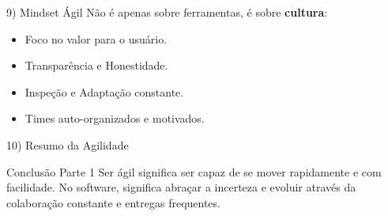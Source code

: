 \documentclass[aspectratio=169]{beamer}
\begin{document}
\begin{frame}{9) Mindset Ágil}
  Não é apenas sobre ferramentas, é sobre \textbf{cultura}:
  \begin{itemize}
    \item Foco no valor para o usuário.
    \item Transparência e Honestidade.
    \item Inspeção e Adaptação constante.
    \item Times auto-organizados e motivados.
  \end{itemize}
\end{frame}

\begin{frame}{10) Resumo da Agilidade}
  \begin{block}{Conclusão Parte 1}
    Ser ágil significa ser capaz de se mover rapidamente e com facilidade. No software, significa abraçar a incerteza e evoluir através da colaboração constante e entregas frequentes.
  \end{block}
\end{frame}

\end{document}
